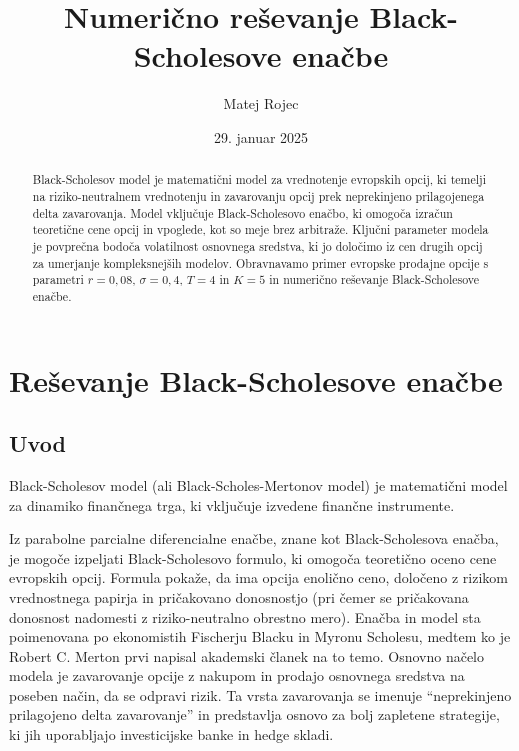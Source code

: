 \documentclass{article}
\title{Numerično reševanje Black-Scholesove enačbe}
\author{Matej Rojec}
\date{29. januar 2025}
\theoremstyle{definition}
\begin{document}
\maketitle

\begin{abstract}
    Black-Scholesov model je matematični model za vrednotenje evropskih opcij, ki temelji na riziko-neutralnem vrednotenju in zavarovanju opcij prek neprekinjeno prilagojenega delta zavarovanja. Model vključuje Black-Scholesovo enačbo, ki omogoča izračun teoretične cene opcij in vpoglede, kot so meje brez arbitraže. Ključni parameter modela je povprečna bodoča volatilnost osnovnega sredstva, ki jo določimo iz cen drugih opcij za umerjanje kompleksnejših modelov.
    Obravnavamo primer evropske prodajne opcije s parametri $r = 0,08$, $\sigma = 0,4$, $T = 4$ in $K = 5$ in numerično reševanje Black-Scholesove enačbe.
\end{abstract}

\section{Reševanje Black-Scholesove enačbe}

\subsection{Uvod}

Black-Scholesov model \cite{wiki} (ali Black-Scholes-Mertonov model) je matematični model za dinamiko finančnega trga, ki vključuje izvedene finančne instrumente. 

Iz parabolne parcialne diferencialne enačbe, znane kot Black-Scholesova enačba, je mogoče izpeljati Black-Scholesovo formulo, ki omogoča teoretično oceno cene evropskih opcij. Formula pokaže, da ima opcija enolično ceno, določeno z rizikom vrednostnega papirja in pričakovano donosnostjo (pri čemer se pričakovana donosnost nadomesti z riziko-neutralno obrestno mero). Enačba in model sta poimenovana po ekonomistih Fischerju Blacku in Myronu Scholesu, medtem ko je Robert C. Merton prvi napisal akademski članek na to temo.
Osnovno načelo modela je zavarovanje opcije z nakupom in prodajo osnovnega sredstva na poseben način, da se odpravi rizik. Ta vrsta zavarovanja se imenuje “neprekinjeno prilagojeno delta zavarovanje” in predstavlja osnovo za bolj zapletene strategije, ki jih uporabljajo investicijske banke in hedge skladi.
\end{document}
